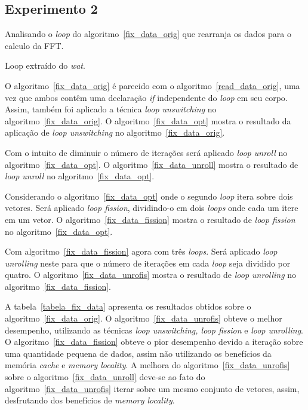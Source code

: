 \subsection{Experimento 2}

Analisando o \textit{loop} do algoritmo~\ref{fix_data_orig} que rearranja os dados
para o calculo da FFT. 

\begin{algorithm}[H]
  \caption{Loop extraído do \textit{wat}.}
    \label{fix_data_orig}

\end{algorithm}

O algoritmo~\ref{fix_data_orig} é parecido com o algoritmo~\ref{read_data_orig}, uma
vez que ambos contêm uma declaração \textit{if} independente do \textit{loop} em seu corpo. 
Assim, também foi aplicado a técnica \textit{loop unswitching} no
algoritmo~\ref{fix_data_orig}.
O algoritmo~\ref{fix_data_opt} mostra o resultado da aplicação de \textit{loop
unswitching} no algoritmo~\ref{fix_data_orig}.

Com o intuito de diminuir o número de iterações será aplicado \textit{loop
unroll} no algoritmo~\ref{fix_data_opt}. 
O algoritmo~\ref{fix_data_unroll} mostra o resultado de \textit{loop unroll} no
algoritmo~\ref{fix_data_opt}.

Considerando o algoritmo~\ref{fix_data_opt} onde o segundo \textit{loop} itera
sobre dois vetores. Será aplicado \textit{loop fission}, dividindo-o em dois 
\textit{loops} onde cada um itere em um vetor.
O algoritmo~\ref{fix_data_fission} mostra o resultado de \textit{loop fission}
no algoritmo~\ref{fix_data_opt}.

Com algoritmo~\ref{fix_data_fission} agora com três \textit{loops}. Será
aplicado \textit{loop unrolling} neste para que o número de iterações em cada
\textit{loop} seja dividido por quatro. 
O algoritmo~\ref{fix_data_unrofis} mostra o resultado de \textit{loop unrolling}
no algoritmo~\ref{fix_data_fission}.

A tabela~\ref{tabela_fix_data} apresenta os resultados obtidos sobre o
algoritmo~\ref{fix_data_orig}.
O algoritmo~\ref{fix_data_unrofis} obteve o melhor desempenho, utilizando as
técnicas \textit{loop unswitching, loop fission} e \textit{loop unrolling}.
O algoritmo~\ref{fix_data_fission} obteve o pior desempenho devido a iteração
sobre uma quantidade pequena de dados, assim não utilizando os benefícios da 
memória \textit{cache} e \textit{memory locality}.
A melhora do algoritmo~\ref{fix_data_unrofis} sobre o
algoritmo~\ref{fix_data_unroll} deve-se ao fato do
algoritmo~\ref{fix_data_unrofis} iterar sobre um mesmo conjunto de vetores,
assim, desfrutando dos benefícios de \textit{memory locality}.

